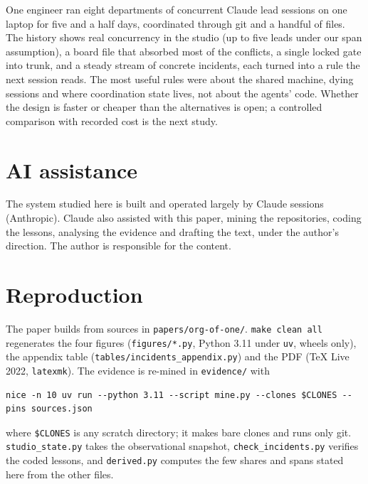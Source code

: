 \documentclass[11pt]{article}
\newcommand{\code}[1]{\texttt{#1}}
\begin{document}
One engineer ran eight departments of concurrent Claude lead sessions on one laptop for
five and a half days, coordinated through git and a handful of files. The history shows
real concurrency in the studio (up to five leads under our span assumption), a board file
that absorbed most of the conflicts, a single locked gate into trunk, and a
steady stream of concrete incidents, each turned into a rule the next session reads. The
most useful rules were about the shared machine, dying sessions and where coordination
state lives, not about the agents' code. Whether the design is faster or cheaper than the
alternatives is open; a controlled comparison with recorded cost is the next study.

\section*{AI assistance}
The system studied here is built and operated largely by Claude sessions (Anthropic).
Claude also assisted with this paper, mining the repositories, coding the lessons,
analysing the evidence and drafting the text, under the author's direction. The author is
responsible for the content.





\appendix
\section{Reproduction}\label{app:repro}

The paper builds from sources in \code{papers/org-of-one/}. \code{make clean all}
regenerates the four figures (\code{figures/*.py}, Python 3.11 under \code{uv}, wheels
only), the appendix table (\code{tables/\allowbreak incidents\_appendix.py}) and the PDF (TeX Live
2022, \code{latexmk}). The evidence is re-mined in \code{evidence/} with
{\small
\begin{verbatim}
nice -n 10 uv run --python 3.11 --script mine.py --clones $CLONES --pins sources.json
\end{verbatim}}
\noindent where \code{\$CLONES} is any scratch directory; it makes bare clones and runs only git.
\code{studio\_state.py} takes the observational snapshot, \code{check\_incidents.py}
verifies the coded lessons, and \code{derived.py} computes the few shares and spans stated
here from the other files.
\end{document}
